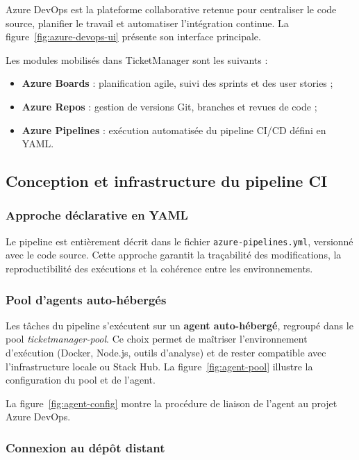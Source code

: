 Azure DevOps est la plateforme collaborative retenue pour centraliser le code source, planifier
le travail et automatiser l'intégration continue. La figure~\ref{fig:azure-devops-ui} présente
son interface principale.

Les modules mobilisés dans TicketManager sont les suivants :
\begin{itemize}
  \item \textbf{Azure Boards} : planification agile, suivi des sprints et des user stories ;
  \item \textbf{Azure Repos} : gestion de versions Git, branches et revues de code ;
  \item \textbf{Azure Pipelines} : exécution automatisée du pipeline CI/CD défini en YAML.
\end{itemize}


\subsection{Conception et infrastructure du pipeline CI}

\subsubsection{Approche déclarative en YAML}

Le pipeline est entièrement décrit dans le fichier \texttt{azure-pipelines.yml}, versionné avec
le code source. Cette approche garantit la traçabilité des modifications, la reproductibilité
des exécutions et la cohérence entre les environnements.

\subsubsection{Pool d'agents auto-hébergés}

Les tâches du pipeline s'exécutent sur un \textbf{agent auto-hébergé}, regroupé dans le pool
\textit{ticketmanager-pool}. Ce choix permet de maîtriser l'environnement d'exécution
(Docker, Node.js, outils d'analyse) et de rester compatible avec l'infrastructure locale ou
Stack Hub. La figure~\ref{fig:agent-pool} illustre la configuration du pool et de l'agent.

La figure~\ref{fig:agent-config} montre la procédure de liaison de l'agent au projet Azure
DevOps.

\subsubsection{Connexion au dépôt distant}

